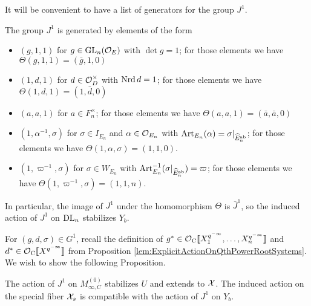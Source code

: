 \documentclass[../main.tex]{subfiles}
\begin{document}
It will be convenient to have a list of generators for the group $J^1$. 
\begin{lem}\label{lem:GeneratorsForJ1}
  The group $J^1$ is generated by elements of the form
  \begin{itemize}
    \item $(g,1,1)$ for $g \in \operatorname{GL}_n(\mathcal{O}_E)$ with $\det g = 1$; for those
      elements we have $\Theta(g,1,1) = (\bar g, 1,0)$
    \item $(1,d,1)$ for $d \in \mathcal{O}_D^\times$ with $\operatorname{Nrd} d = 1$; for those
      elements we have $\Theta(1,d,1) = (1 , \bar d,0)$
    \item $(a,a,1)$ for $a \in F_n^\times$; for those
      elements we have $\Theta(a,a,1) = (\bar a, \bar a,0)$
    \item $(1, \alpha^{-1}, \sigma)$ for $\sigma \in I_{E_n}$ 
      and $\alpha \in \mathcal{O}_{E_n}$ with $\mathrm{Art}_{E_n}(\alpha) = \sigma|_{\widehat
      E_n^{\mathrm{ab}}}$; for those
      elements we have $\Theta(1,\alpha,\sigma) = (1, 1,0)$.
    \item $(1, \varpi^{-1}, \sigma)$ for $\sigma \in W_{E_n}$ with
      $\mathrm{Art}^{-1}_{E_n}(\sigma|_{\widehat E_n^{\mathrm{ab}}}) = \varpi$; for those
      elements we have $\Theta(1,\varpi^{-1},\sigma) = (1, 1,n)$. 
  \end{itemize}
  \end{lem}
In particular, the image of $J^1$ under the homomorphism $\Theta$ is 
$\bar J^1$, so the induced action of $J^1$ on $\mathrm{DL}_n$ stabilizes $Y_b$.

For $(g,d,\sigma) \in G^1$, recall the definition of $g^* \in \mathcal{O}_{\mathrm{C}}\llbracket
X_1^{q^{-\infty}}, \dots, X_n^{q^{-\infty}}\rrbracket$ and 
$d^* \in \mathcal{O}_{\mathrm{C}} \llbracket X^{q^{-\infty}} \rrbracket$ from Proposition
\ref{lem:ExplicitActionOnQthPowerRootSystems}. 
We wish to show the following Proposition.

\begin{prop}\label{prop:J1ActionOnAffinoid}
  The action of $J^1$ on $M_{\infty, C}^{(0)}$ stabilizes $U$ and extends to
  $\mathcal{X}$. The induced action on the special fiber $\mathcal{X}_s$ is compatible with the
  action of $J^1$ on $Y_b$.
\end{prop}
\end{document}
